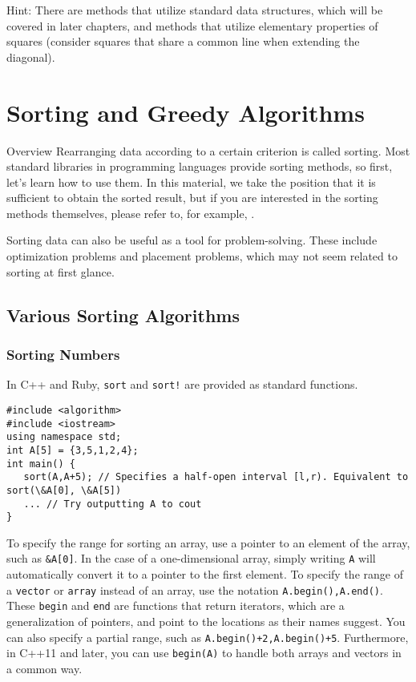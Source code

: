 Hint: There are methods that utilize standard data structures, which will be covered in later chapters, and methods that utilize elementary properties of squares (consider squares that share a common line when extending the diagonal).

\chapter{Sorting and Greedy Algorithms}\label{chapter:greedy}

\begin{itembox}[l]{Overview}
Rearranging data according to a certain criterion is called sorting.
Most standard libraries in programming languages provide sorting methods, so first, let's learn how to use them. In this material, we take the position that it is sufficient to obtain the sorted result, but if you are interested in the sorting methods themselves, please refer to, for example, \pcaojbook[pp.~51--(Chapter 3)].

Sorting data can also be useful as a tool for problem-solving. These include optimization problems and placement problems, which may not seem related to sorting at first glance.
\end{itembox}
\section{Various Sorting Algorithms}
\subsection{Sorting Numbers}\label{section:sort}

In C++ and Ruby, \texttt{sort} and \texttt{sort!} are provided as standard functions.
\begin{cbox}[emph={algorithm,sort}]
\begin{verbatim}
#include <algorithm>
#include <iostream>
using namespace std;
int A[5] = {3,5,1,2,4};
int main() {
   sort(A,A+5); // Specifies a half-open interval [l,r). Equivalent to sort(\&A[0], \&A[5])
   ... // Try outputting A to cout
}
\end{verbatim}
\end{cbox}
To specify the range for sorting an array, use a pointer to an element of the array, such as \texttt{\&A[0]}. In the case of a one-dimensional array, simply writing \texttt{A} will automatically convert it to a pointer to the first element.
To specify the range of a \texttt{vector} or \texttt{array} instead of an array, use the notation \texttt{A.begin(),A.end()}. These \texttt{begin} and \texttt{end} are functions that return iterators, which are a generalization of pointers, and point to the locations as their names suggest. You can also specify a partial range, such as \texttt{A.begin()+2,A.begin()+5}. Furthermore, in C++11 and later, you can use \texttt{begin(A)} to handle both arrays and vectors in a common way.

